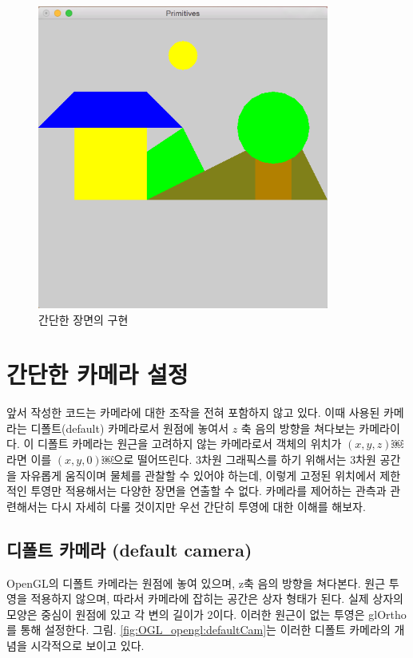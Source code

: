 \begin{figure}[h!]
  \centering
    \includegraphics[height=10cm]{OGL_opengl/simpleScene.png}
    \caption{간단한 장면의 구현}
    \label{fig:OGL_opengl:simpleScene}
\end{figure}

\section{간단한 카메라 설정}

앞서 작성한 코드는 카메라에 대한 조작을 전혀 포함하지 않고 있다. 
이때 사용된 카메라는 디폴트(default) 카메라로서 원점에 놓여서 $z$ 축 음의 방향을 쳐다보는 카메라이다. 
이 디폴트 카메라는 원근을 고려하지 않는 카메라로서 객체의 위치가 $(x,y,z)$￼라면 이를 $(x,y,0)$￼으로 떨어뜨린다.
3차원 그래픽스를 하기 위해서는 3차원 공간을 자유롭게 움직이며 물체를 관찰할 수 있어야 하는데, 
이렇게 고정된 위치에서 제한적인 투영만 적용해서는 다양한 장면을 연출할 수 없다. 
카메라를 제어하는 관측과 관련해서는 다시 자세히 다룰 것이지만 
우선 간단히 투영에 대한 이해를 해보자.


\subsection{디폴트 카메라 (default camera)}

OpenGL의 디폴트 카메라는 원점에 놓여 있으며, z축 음의 방향을 쳐다본다. 원근 투영을 적용하지 않으며, 따라서 카메라에 잡히는 공간은 상자 형태가 된다. 실제 상자의 모양은 중심이 원점에 있고 각 변의 길이가 2이다. 이러한 원근이 없는 투영은 glOrtho를 통해 설정한다. 그림. \ref{fig:OGL_opengl:defaultCam}는 이러한 디폴트 카메라의 개념을 시각적으로 보이고 있다.

